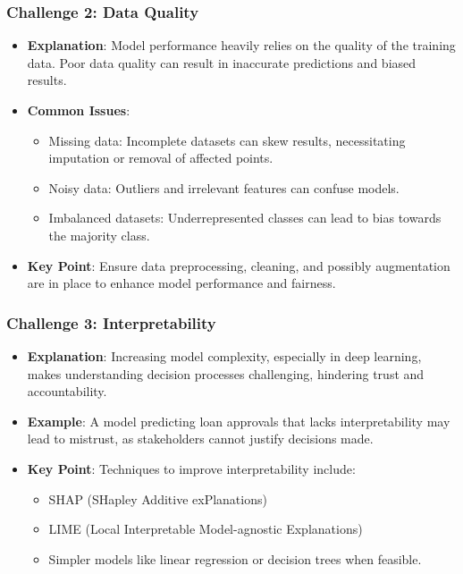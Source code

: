 \documentclass[aspectratio=169]{beamer}
\begin{document}
\begin{frame}[fragile]
    \frametitle{Challenge 2: Data Quality}
    \begin{itemize}
        \item \textbf{Explanation}: Model performance heavily relies on the quality of the training data. Poor data quality can result in inaccurate predictions and biased results.
        \item \textbf{Common Issues}:
        \begin{itemize}
            \item Missing data: Incomplete datasets can skew results, necessitating imputation or removal of affected points.
            \item Noisy data: Outliers and irrelevant features can confuse models.
            \item Imbalanced datasets: Underrepresented classes can lead to bias towards the majority class.
        \end{itemize}
        \item \textbf{Key Point}: Ensure data preprocessing, cleaning, and possibly augmentation are in place to enhance model performance and fairness.
    \end{itemize}
\end{frame}

\begin{frame}[fragile]
    \frametitle{Challenge 3: Interpretability}
    \begin{itemize}
        \item \textbf{Explanation}: Increasing model complexity, especially in deep learning, makes understanding decision processes challenging, hindering trust and accountability.
        \item \textbf{Example}: A model predicting loan approvals that lacks interpretability may lead to mistrust, as stakeholders cannot justify decisions made.
        \item \textbf{Key Point}: Techniques to improve interpretability include:
        \begin{itemize}
            \item SHAP (SHapley Additive exPlanations)
            \item LIME (Local Interpretable Model-agnostic Explanations)
            \item Simpler models like linear regression or decision trees when feasible.
        \end{itemize}
    \end{itemize}
\end{frame}
\end{document}

